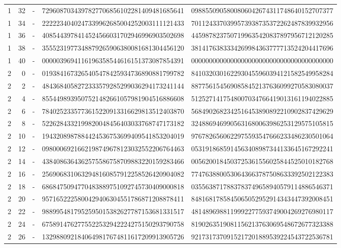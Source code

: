 \begin{longtable}{rrrll}
1 & 32 & - & 7296087034397827706856102281409481685641 & 0988550905800806042674311748640152707377 \\
1 & 34 & - & 2222234040247339962685004252003111121433 & 7011243370399573938735372262487839932956 \\
1 & 36 & - & 4085443978414524566031702946996903502698 & 4459878237507199635420837897956712120285 \\
1 & 38 & - & 3555231977348879265906380081681304456120 & 3814176383334269984363777713524204417696 \\
1 & 40 & - & 0000039694116196358544616151373087854391 & 0000000000000000000000000000000000000000 \\
2 & 0 & - & 0193841673265405478425934736890881799782 & 8410320301622930455960394121582549958284 \\
2 & 2 & - & 4843684058272333579285299036294173241144 & 8877561545690858452137636099270583080037 \\
2 & 4 & - & 8554498939507521482661057981904516886608 & 5125271417548007034766419013161194022885 \\
2 & 6 & - & 7840252335773615220913316629813512403870 & 5684902682342516453890892210902837429629 \\
2 & 8 & - & 5226284332199820048456403033768747173182 & 3248869469905631680063986253129575105815 \\
2 & 10 & - & 1943208987884424536753699409541853204019 & 9767826560622975593547666233486230501064 \\
2 & 12 & - & 0980006921662198749678123032552206764463 & 0531918685914563408987344133645167292241 \\
2 & 14 & - & 4384086364362575586758709883220159283466 & 0056200184503725361556025844525010182768 \\
2 & 16 & - & 2569068310632948160857912258526420904082 & 7747638800530643663787508633392502122383 \\
2 & 18 & - & 6868475094770483889751092745730409000818 & 0355638717883783749658940579114886546371 \\
2 & 20 & - & 9571652225800429406304551786871208878411 & 8481681785845065052952914343447392008451 \\
2 & 22 & - & 9889954817952595015382627787153681331517 & 4814896988119992277593749004269276980117 \\
2 & 24 & - & 6758914762775522532942224275150293790758 & 8190263519081156213763069548672677323388 \\
2 & 26 & - & 1329880921840649817674811617209913905726 & 9217317370915217201889539224543722536781 \\

\end{longtable}
